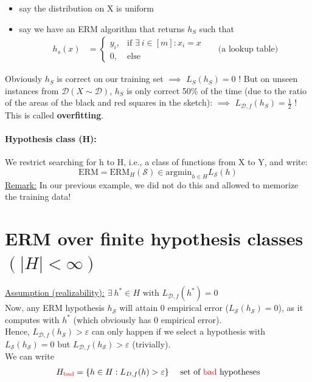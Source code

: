 \documentclass[10pt,a4paper]{article}
\theoremstyle{remark}
\theoremstyle{definition}
\theoremstyle{plain}
\begin{document}
\begin{itemize}
	\item say the distribution on X is uniform
	\item say we have an ERM algorithm that returns $h_S$ such that 
	\begin{align*}
			 h_s(x) &= \begin{cases}
			y_i , &  \text{if } \exists \ i \in [m]: x_i = x  \\
			0 , &  \text{else} 
		\end{cases} && \text{(a lookup table)} 
	\end{align*}
\end{itemize}
Obviously $h_S$ is correct on our training set $\implies$ \colorbox{Apricot}{$L_S(h_S) = 0 \text{ !}$}
But on unseen instances from $\mathcal{D} (X \sim \mathcal{D})$, $h_S$ is only correct 50\% of the time (due to the ratio of the areas of the black and red squares in the sketch): $\implies $ \colorbox{Apricot}{$L_{\mathcal{D},f}(h_S) = \frac{1}{2} \text{ !}$}
This is called \textbf{overfitting}.

\paragraph{Hypothesis class (H):} We restrict searching for h to H, i.e., a class of functions from X to Y, and write:
$$
\text{ERM} = \text{ERM}_{H} (\mathcal{S}) \in \text{argmin}_{h \in H} L_{\mathcal{S}}(h)
$$
\underline{Remark:} In our previous example, we did not do this and allowed to memorize the training data!

\section{ERM over finite hypothesis classes $(\big|H\big| < \infty)$}
\underline{Assumption (realizability):} $ \exists \ h^*\in H \text{ with } L_{\mathcal{D},f}(h^*) = 0$\\
\newline
Now, any ERM hypothesis $h_\mathcal{S}$ will attain 0 empirical error ($L_\mathcal{S}(h_\mathcal{S}) = 0$), as it computes with $h^*$ (which obviously has 0 empirical error).\\
\newline
Hence, $L_{\mathcal{D},f}(h_\mathcal{S}) > \varepsilon$ can only happen if we select a hypothesis with $L_\mathcal{S}(h_\mathcal{S}) = 0$ but $L_{\mathcal{D},f}(h_\mathcal{S}) > \varepsilon$ (trivially).\\
 We can write
\begin{align*}
	H_\text{\textcolor{red}{bad}} &= \{h \in H: L_{D,f}(h)>\varepsilon\} && \text{ set of \textcolor{red}{bad} hypotheses}\\
\end{align*}
\end{document}
